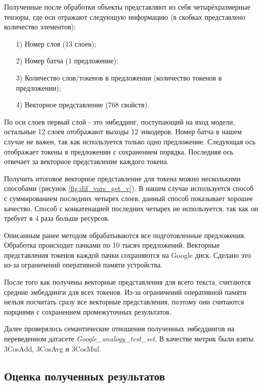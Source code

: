 \documentclass[a4paper,14pt]{article}
\begin{document}
	Полученные после обработки объекты представляют из себя четырёхразмерные тензоры, где оси отражают следующую информацию (в скобках представлено количество элементов):
	
	\begin{enumerate}
		
		\item[1)] Номер слоя (13 слоев);
		
		\item[2)] Номер батча (1 предложение);
		
		\item[3)] Количество слов/токенов в предложении (количество токенов в предложении);
		
		\item[4)] Векторное представление (768 свойств).

	\end{enumerate}	

	По оси слоев первый слой - это эмбеддинг, поступающий на вход модели, остальные 12 слоев отображают выходы 12 энкодеров.
	Номер батча в нашем случае не важен, так как используется только одно предложение.
	Следующая ось отображает токены в предложении с сохранением порядка.
	Последняя ось отвечает за векторное представление каждого токена.
	
	Получить итоговое векторное представление для токена можно несколькими способами (рисунок \ref{fig:dif_vars_get_v}).
	В нашем случае используется способ с суммированием последних четырех слоев, данный способ показывает хорошее качество.
	Способ с конкатенацией последних четырех не используется, так как он требует в 4 раза больше ресурсов.
	
	Описанным ранее методом обрабатываются все подготовленные предложения.
	Обработка происходит пачками по 10 тысяч предложений.
	Векторные представления токенов каждой пачки сохраняются на Google диск.
	Сделано это из-за ограничений оперативной памяти устройства.
	
	После того как получены векторные представления для всего текста, считаются средние эмбеддинги для всех токенов.
	Из-за ограничений оперативной памяти нельзя посчитать сразу все векторные представления, поэтому они считаются порциями с сохранением промежуточных результатов.
	
	Далее проверялось семантические отношения полученных эмбеддингов на переведенном датасете \textit{Google\_analogy\_test\_set}.
	В качестве метрик были взяты 3CosAdd, 3CosAvg и 3CosMul.
	
	\subsection{Оценка полученных результатов}
	
\end{document}
